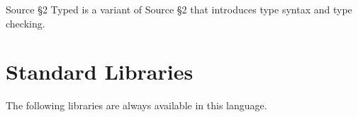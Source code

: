 





Source \S 2 Typed is a variant of Source \S 2 that introduces type syntax and type checking.





\newpage



















\section{Standard Libraries}

The following libraries are always available in this language.









\newpage




